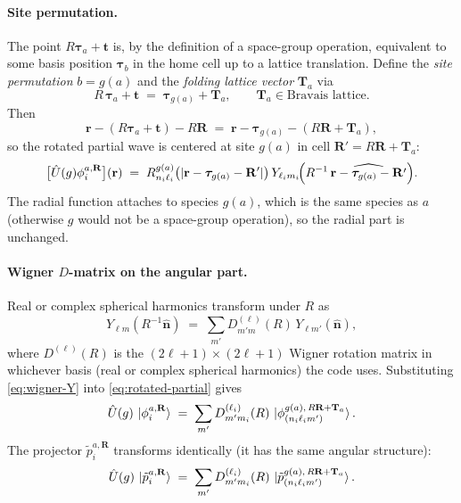 \documentclass[11pt,a4paper]{article}
\newcommand{\rr}{\mathbf{r}}
\newcommand{\RR}{\mathbf{R}}
\newcommand{\TT}{\mathbf{T}}
\newcommand{\tautau}{\boldsymbol{\tau}}
\newcommand{\tvec}{\mathbf{t}}
\newcommand{\Uhat}{\hat{U}}
\begin{document}
\paragraph{Site permutation.} The point $R\tautau_a + \tvec$ is, by the
definition of a space-group operation, equivalent to some basis position
$\tautau_b$ in the home cell up to a lattice translation. Define the
\emph{site permutation} $b = g(a)$ and the \emph{folding lattice vector}
$\TT_a$ via
\begin{equation}
R\,\tautau_a + \tvec \;=\; \tautau_{g(a)} + \TT_a, \qquad \TT_a \in \text{Bravais lattice}.
\label{eq:site-permutation}
\end{equation}
Then
\begin{equation}
\rr - (R\tautau_a + \tvec) - R\RR
  \;=\; \rr - \tautau_{g(a)} - (R\RR + \TT_a),
\end{equation}
so the rotated partial wave is centered at site $g(a)$ in cell
$\RR' = R\RR + \TT_a$:
\begin{equation}
\bigl[\Uhat(g)\phi_i^{a,\RR}\bigr](\rr)
  \;=\; R_{n_i\ell_i}^{g(a)}\bigl(|\rr - \tautau_{g(a)} - \RR'|\bigr)\,
        Y_{\ell_i m_i}\!\Bigl(R^{-1}\,\widehat{\rr - \tautau_{g(a)} - \RR'}\Bigr).
\label{eq:rotated-partial}
\end{equation}
The radial function attaches to species $g(a)$, which is the same species as
$a$ (otherwise $g$ would not be a space-group operation), so the radial part
is unchanged.

\paragraph{Wigner $D$-matrix on the angular part.} Real or complex spherical
harmonics transform under $R$ as
\begin{equation}
Y_{\ell m}(R^{-1}\hat{\mathbf n})
  \;=\; \sum_{m'} D^{(\ell)}_{m'm}(R)\,Y_{\ell m'}(\hat{\mathbf n}),
\label{eq:wigner-Y}
\end{equation}
where $D^{(\ell)}(R)$ is the $(2\ell+1)\times(2\ell+1)$ Wigner rotation matrix
in whichever basis (real or complex spherical harmonics) the code uses.
Substituting \eqref{eq:wigner-Y} into \eqref{eq:rotated-partial} gives
\begin{equation}
\Uhat(g)\,\ket{\phi_i^{a,\RR}}
  \;=\; \sum_{m'} D^{(\ell_i)}_{m' m_i}(R)\,
        \ket{\phi_{(n_i\ell_i m')}^{g(a),\,R\RR + \TT_a}}.
\label{eq:partial-localized-symm}
\end{equation}
The projector $\tilde p_i^{a,\RR}$ transforms identically (it has the same
angular structure):
\begin{equation}
\Uhat(g)\,\ket{\tilde p_i^{a,\RR}}
  \;=\; \sum_{m'} D^{(\ell_i)}_{m' m_i}(R)\,
        \ket{\tilde p_{(n_i\ell_i m')}^{g(a),\,R\RR + \TT_a}}.
\label{eq:projector-localized-symm}
\end{equation}
\end{document}
